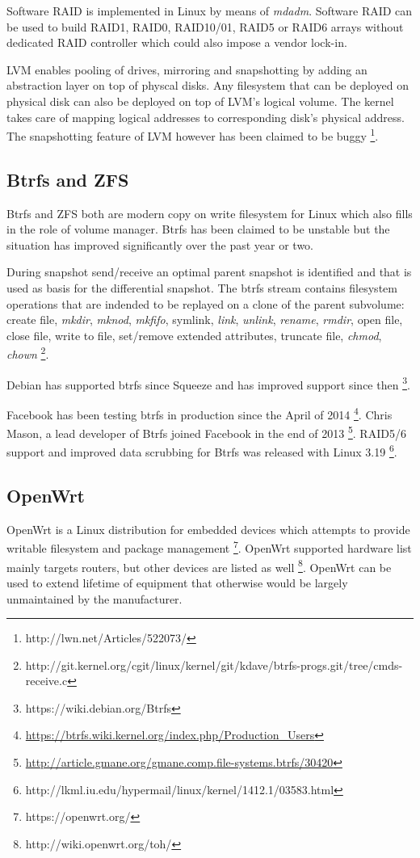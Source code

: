 \documentclass{article}
\begin{document}
Software RAID is implemented in Linux by means of \emph{mdadm}. Software RAID can be used to build RAID1, RAID0, RAID10/01, RAID5 or RAID6 arrays without dedicated RAID controller which could also impose a vendor lock-in.

LVM enables pooling of drives, mirroring and snapshotting by adding an abstraction layer on top of physcal disks. Any filesystem that can be deployed on physical disk can also be deployed on top of LVM's logical volume. The kernel takes care of mapping logical addresses to corresponding disk's physical address. The snapshotting feature of LVM however has been claimed to be buggy \footnote{http://lwn.net/Articles/522073/}.

\subsection{Btrfs and ZFS}

Btrfs and ZFS both are modern copy on write filesystem for Linux which also fills in the role of volume manager. Btrfs has been claimed to be unstable but the situation has improved significantly over the past year or two. 

During snapshot send/receive an optimal parent snapshot is identified and that is used as basis for the differential snapshot. The btrfs stream contains filesystem operations that are indended to be replayed on a clone of the parent subvolume: create file, \emph{mkdir}, \emph{mknod}, \emph{mkfifo}, symlink, \emph{link}, \emph{unlink}, \emph{rename}, \emph{rmdir}, open file, close file, write to file, set/remove extended attributes, truncate file, \emph{chmod}, \emph{chown} \footnote{http://git.kernel.org/cgit/linux/kernel/git/kdave/btrfs-progs.git/tree/cmds-receive.c}.

Debian has supported btrfs since Squeeze and has improved support since then \footnote{https://wiki.debian.org/Btrfs}.  

Facebook has been testing btrfs in production since the April of 2014 \footnote{\url{https://btrfs.wiki.kernel.org/index.php/Production_Users}}. Chris Mason, a lead developer of Btrfs joined Facebook in the end of 2013 \footnote{\url{http://article.gmane.org/gmane.comp.file-systems.btrfs/30420}}. RAID5/6 support and improved data scrubbing for Btrfs was released with Linux 3.19 \footnote{http://lkml.iu.edu/hypermail/linux/kernel/1412.1/03583.html}.


\subsection{OpenWrt}
OpenWrt is a Linux distribution for embedded devices which attempts to provide writable filesystem and package management \footnote{https://openwrt.org/}. OpenWrt supported hardware list mainly targets routers, but other devices are listed as well \footnote{http://wiki.openwrt.org/toh/}. OpenWrt can be used to extend lifetime of equipment that otherwise would be largely unmaintained by the manufacturer.
\end{document}
